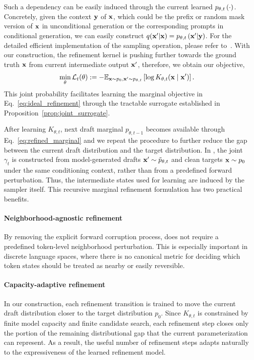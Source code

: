 Such a dependency can be easily induced through the current learned $p_{\theta, t}\left(\cdot\right)$. Concretely, given the context $\mathbf{y}$ of $\mathbf{x}$, which could be the prefix or random mask version of $\mathbf{x}$ in unconditional generation or the corresponding prompts in conditional generation, we can easily construct $q(\mathbf{x}'|\mathbf{x}) = p_{\theta, t}\left(\mathbf{x}'|\mathbf{y}\right)$. For the detailed efficient implementation of the sampling operation, please refer to~. 
With our construction, the refinement kernel is pushing further towards the ground truth $\mathbf{x}$ from current intermediate output $\mathbf{x}'$, therefore, we obtain our objective,
\begin{equation}
    \min_{\theta} \mathcal{L}_{t}(\theta)
    :=
    -
    \mathbb{E}_{\mathbf{x}\sim p_0, \mathbf{x}'\sim p_{\theta,t}}\left[
    \log K_{\theta,t}(\mathbf{x}\mid\mathbf{x}')\right].
    \label{eq:conditional_refinement_loss}
\end{equation}
This joint probability facilitates learning the marginal objective in Eq.~\eqref{eq:ideal_refinement} through the tractable surrogate established in Proposition~\ref{prop:joint_surrogate}.



After learning $K_{\theta,t}$, next draft marginal $p_{\theta,t-1}$ becomes available through Eq.~\eqref{eq:refined_marginal} and we repeat the procedure to further reduce the gap between the current draft distribution and the target distribution.
In \method, the joint $\gamma_t$ is constructed from model-generated drafts $\mathbf{x}'\sim \tilde{p}_{\theta,t}$ and clean targets $\mathbf{x}\sim p_0$ under the same conditioning context, rather than from a predefined forward perturbation. 
Thus, the intermediate states used for learning are induced by the sampler itself.
This recursive marginal refinement formulation has two practical benefits.

\paragraph{Neighborhood-agnostic refinement}
By removing the explicit forward corruption process, \method does not require a predefined token-level neighborhood perturbation. 
This is especially important in discrete language spaces, where there is no canonical metric for deciding which token states should be treated as nearby or easily reversible.


\paragraph{Capacity-adaptive refinement}
In our construction, each refinement transition is trained to move the current draft distribution closer to the target distribution $p_0$. 
Since $K_{\theta,t}$ is constrained by finite model capacity and finite candidate search, each refinement step closes only the portion of the remaining distributional gap that the current parameterization can represent. 
As a result, the useful number of refinement steps adapts naturally to the expressiveness of the learned refinement model.

